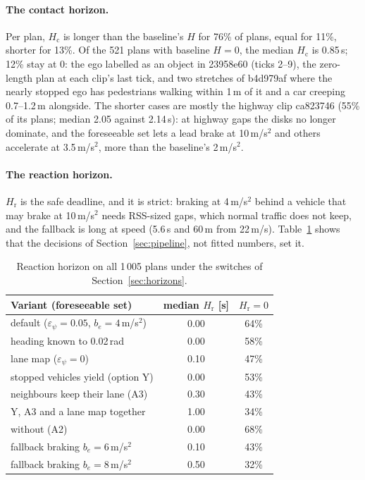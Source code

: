 \documentclass[11pt]{article}
\theoremstyle{definition}
\theoremstyle{remark}
\newcommand{\Hc}{H_{\mathrm{c}}}
\newcommand{\Hr}{H_{\mathrm{r}}}
\begin{document}
\paragraph{The contact horizon.} Per plan, $\Hc$ is longer than the baseline's $H$ for 76\% of plans, equal
for 11\%, shorter for 13\%. Of the 521 plans with baseline $H=0$, the median $\Hc$ is 0.85\,s; 12\% stay at
0: the ego labelled as an object in 23958e60 (ticks 2--9), the zero-length plan at each clip's last tick,
and two stretches of b4d979af where the nearly stopped ego has pedestrians walking within 1\,m of it
and a car creeping 0.7--1.2\,m alongside. The shorter cases are mostly the highway clip ca823746 (55\% of
its plans; median 2.05 against 2.14\,s): at highway gaps the disks no longer dominate, and the foreseeable
set lets a lead brake at 10\,m/s$^2$ and others accelerate at 3.5\,m/s$^2$, more than the baseline's 2\,m/s$^2$.

\paragraph{The reaction horizon.} $\Hr$ is the safe deadline, and it is strict: braking at 4\,m/s$^2$ behind a
vehicle that may brake at 10\,m/s$^2$ needs RSS-sized gaps, which normal traffic does not keep, and the
fallback is long at speed (5.6\,s and 60\,m from 22\,m/s). Table~\ref{tab:hr} shows that the decisions of
Section~\ref{sec:pipeline}, not fitted numbers, set it.

\begin{table}[h]
\centering
\begin{tabular}{lcc}
\toprule
Variant (foreseeable set) & median $\Hr$ [s] & $\Hr=0$ \\
\midrule
default ($\varepsilon_\psi=0.05$, $b_e=4$\,m/s$^2$) & 0.00 & 64\% \\
heading known to 0.02\,rad & 0.00 & 58\% \\
lane map ($\varepsilon_\psi=0$) & 0.10 & 47\% \\
stopped vehicles yield (option Y) & 0.00 & 53\% \\
neighbours keep their lane (A3) & 0.30 & 43\% \\
Y, A3 and a lane map together & 1.00 & 34\% \\
without (A2) & 0.00 & 68\% \\
\midrule
fallback braking $b_e=6$\,m/s$^2$ & 0.10 & 43\% \\
fallback braking $b_e=8$\,m/s$^2$ & 0.50 & 32\% \\
\bottomrule
\end{tabular}
\caption{Reaction horizon on all 1\,005 plans under the switches of Section~\ref{sec:horizons}.}
\label{tab:hr}
\end{table}
\end{document}
